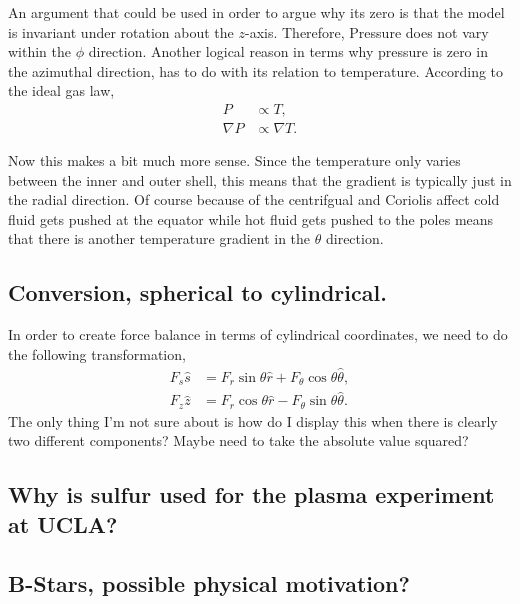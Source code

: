 An argument that could be used in order to argue why its zero is that the model is invariant under rotation about the $z$-axis. Therefore, Pressure does not vary within the $\phi$ direction. Another logical reason in terms why pressure is zero in the azimuthal direction, has to do with its relation to temperature. According to the ideal gas law, 
\begin{align}
	P &\propto T, \\
	\nabla P &\propto \nabla T.
\end{align} 

Now this makes a bit much more sense. Since the temperature only varies between the inner and outer shell, this means that the gradient is typically just in the radial direction. Of course because of the centrifgual and Coriolis affect cold fluid gets pushed at the equator while hot fluid gets pushed to the poles means that there is another temperature gradient in the $\theta$ direction.  


\subsection{Conversion, spherical to cylindrical.}
In order to create force balance in terms of cylindrical coordinates, we need to do the following transformation, 
\begin{align}
	F_s \hat{s} &= F_r \sin{\theta} \hat{r} + F_{\theta} \cos{\theta} \hat{\theta}, \\
	F_z \hat{z} &= F_r \cos{\theta} \hat{r} - F_{\theta} \sin{\theta} \hat{\theta}.
\end{align}
The only thing I'm not sure about is how do I display this when there is clearly two different components? Maybe need to take the absolute value squared? 

\subsection{Why is sulfur used for the plasma experiment at UCLA?}

\subsection{B-Stars, possible physical motivation?}
